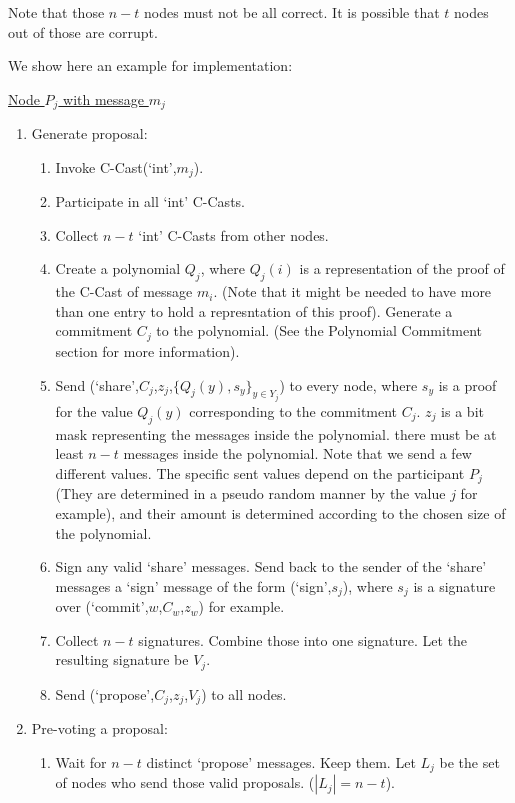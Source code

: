 Note that those $n-t$ nodes must not be all correct. It is possible that $t$
nodes out of those are corrupt.

We show here an example for implementation:

\uline{Node $P_j$ with message $m_j$}
\begin{enumerate}
  \item Generate proposal:
  \begin{enumerate}
    \item Invoke C-Cast(`int',$m_j$).
    \item Participate in all `int' C-Casts.
    \item Collect $n-t$ `int' C-Casts from other nodes.
    \item Create a polynomial $Q_j$, where $Q_j(i)$ is a representation of the
      proof of the C-Cast of message $m_i$. (Note that it might be needed to
      have more than one entry to hold a represntation of this proof). Generate
      a commitment $C_j$ to the polynomial. (See the Polynomial Commitment
      section for more information).
    \item Send (`share',$C_j$,$z_j$,$\{Q_j(y),s_y\}_{y \in Y_j}$) to every node,
      where $s_y$ is a proof for the value $Q_j(y)$ corresponding to the
      commitment $C_j$. $z_j$ is a bit mask representing the messages inside
      the polynomial. there must be at least $n-t$ messages inside the
      polynomial. Note that we send a few different values. The specific sent
      values depend on the participant $P_j$ (They are determined in a pseudo
      random manner by the value $j$ for example), and their amount is
      determined according to the chosen size of the polynomial.
    \item Sign any valid `share' messages. Send back to the sender of the
      `share' messages a `sign' message of the form (`sign',$s_j$), where $s_j$
      is a signature over (`commit',$w$,$C_w$,$z_w$) for example.
    \item Collect $n-t$ signatures. Combine those into one signature. Let the
      resulting signature be $V_j$.
    \item Send (`propose',$C_j$,$z_j$,$V_j$) to all nodes.
  \end{enumerate}
  \item Pre-voting a proposal:
  \begin{enumerate}
    \item Wait for $n-t$ distinct `propose' messages. Keep them. Let $L_j$ be
      the set of nodes who send those valid proposals. ($|L_j| = n-t$).

\end{enumerate}
\end{enumerate}
